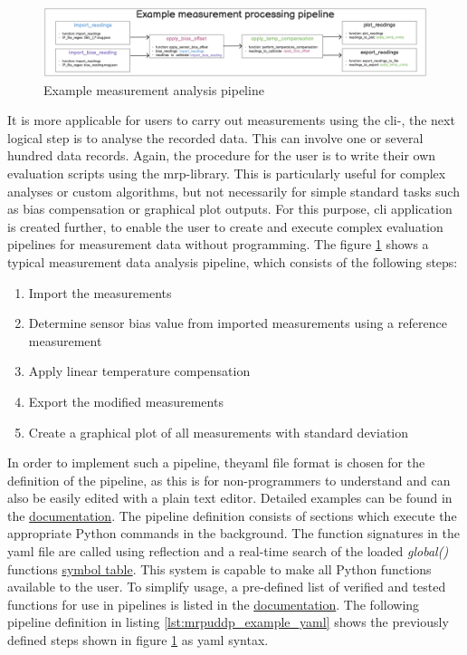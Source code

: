 \begin{figure}
\centering
\includegraphics{./generated_images/border_Example_measurement_analysis_pipeline.png}
\caption{Example measurement analysis pipeline
\label{Example_measurement_analysis_pipeline.png}}
\end{figure}

It is more applicable for users to carry out measurements using the
\gls{cli}-, the next logical step is to analyse the recorded data. This
can involve one or several hundred data records. Again, the procedure
for the user is to write their own evaluation scripts using the
\gls{mrp}-library. This is particularly useful for complex analyses or
custom algorithms, but not necessarily for simple standard tasks such as
bias compensation or graphical plot outputs. For this purpose, \gls{cli}
application is created further, to enable the user to create and execute
complex evaluation pipelines for measurement data without programming.
The figure \ref{Example_measurement_analysis_pipeline.png} shows a
typical measurement data analysis pipeline, which consists of the
following steps:

\begin{enumerate}
\def\labelenumi{\arabic{enumi}.}
\tightlist
\item
  Import the measurements
\item
  Determine sensor bias value from imported measurements using a
  reference measurement
\item
  Apply linear temperature compensation
\item
  Export the modified measurements
\item
  Create a graphical plot of all measurements with standard deviation
\end{enumerate}

In order to implement such a pipeline, the\gls{yaml} file format is
chosen for the definition of the pipeline, as this is for
non-programmers to understand and can also be easily edited with a plain
text editor. Detailed examples can be found in the
\href{https://magneticreadoutprocessing.readthedocs.io/en/latest/}{documentation}.
The pipeline definition consists of sections which execute the
appropriate Python commands in the background. The function signatures
in the \gls{yaml} file are called using reflection and a real-time
search of the loaded \emph{global()} functions
\href{https://docs.python.org/3/library/functions.html#globals}{symbol table}.
This system is capable to make all Python functions available to the
user. To simplify usage, a pre-defined list of verified and tested
functions for use in pipelines is listed in the
\href{https://magneticreadoutprocessing.readthedocs.io/en/latest/}{documentation}.
The following pipeline definition in listing
\ref{lst:mrpuddp_example_yaml} shows the previously defined steps shown
in figure \ref{Example_measurement_analysis_pipeline.png} as \gls{yaml}
syntax.

